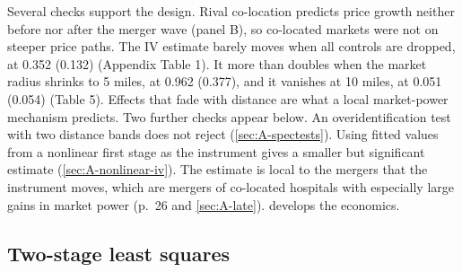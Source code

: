 Several checks support the design. Rival co-location predicts price growth neither before nor after the
merger wave (panel B), so co-located markets were not on steeper price paths. The IV estimate barely moves
when all controls are dropped, at 0.352 (0.132) (Appendix Table 1). It more than doubles when the market
radius shrinks to 5 miles, at 0.962 (0.377), and it vanishes at 10 miles, at 0.051 (0.054) (Table 5). Effects
that fade with distance are what a local market-power mechanism predicts. Two further checks appear below. An
overidentification test with two distance bands does not reject (\cref{sec:A-spectests}). Using fitted values
from a nonlinear first stage as the instrument gives a smaller but significant estimate
(\cref{sec:A-nonlinear-iv}). The estimate is local to the mergers that the instrument moves, which are mergers
of co-located hospitals with especially large gains in market power (p.~26 and \cref{sec:A-late}).
 develops the economics.

\subsection{Two-stage least squares}\label{sec:A-2sls}

